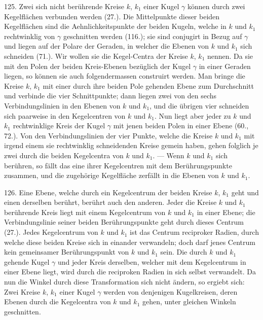 \label{p14}


\hspace{\parindent}%
125. Zwei sich nicht ber\"uhrende Kreise $k$, $k_1$ einer
Kugel $\gamma$ k\"onnen durch zwei Kegelfl\"achen verbunden werden
(27.). Die Mittelpunkte dieser beiden Kegelfl\"achen sind die
Aehnlichkeitspunkte der beiden Kugeln, welche in $k$ und $k_1$
rechtwinklig von $\gamma$ geschnitten werden (116.); sie sind conjugirt
in Bezug auf $\gamma$ und liegen auf der Polare der Geraden,
in welcher die Ebenen von $k$ und $k_1$ sich schneiden (71.).
Wir wollen sie die {\glqq}Kegel-Centra{\grqq} der Kreise $k$, $k_1$ nennen.
Da sie mit den Polen der beiden Kreis-Ebenen bez\"uglich der
Kugel $\gamma$ in einer Geraden liegen, so k\"onnen sie auch folgendermassen
construirt werden. Man bringe die Kreise $k$, $k_1$ mit
einer durch ihre beiden Pole gehenden Ebene zum Durchschnitt
und verbinde die vier Schnittpunkte; dann liegen
zwei von den sechs Verbindungslinien in den Ebenen von $k$
und $k_1$, und die \"ubrigen vier schneiden sich paarweise in den
Kegelcentren von $k$ und $k_1$. Nun liegt aber jeder zu $k$ und $k_1$
rechtwinklige Kreis der Kugel $\gamma$ mit jenen beiden Polen in
einer Ebene (60., 72.). Von den Verbindungslinien der vier
Punkte, welche die Kreise $k$ und $k_1$ mit irgend einem sie
rechtwinklig schneidenden Kreise gemein haben, gehen folglich
je zwei durch die beiden Kegelcentra von $k$ und $k_1$. --- Wenn
$k$ und $k_1$ sich ber\"uhren, so f\"allt das eine ihrer Kegelcentren
mit dem Ber\"uhrungspunkte zusammen, und die zugeh\"orige
Kegelfl\"ache zerf\"allt in die Ebenen von $k$ und $k_1$.

126. Eine Ebene, welche durch ein Kegelcentrum der
beiden Kreise $k$, $k_1$ geht und einen derselben ber\"uhrt, ber\"uhrt
auch den anderen. Jeder die Kreise $k$ und $k_1$ ber\"uhrende
Kreis liegt mit einem Kegelcentrum von $k$ und $k_1$ in einer
Ebene; die Verbindungslinie seiner beiden Ber\"uhrungspunkte
geht durch dieses Centrum (27.). Jedes Kegelcentrum von
$k$ und $k_1$ ist das Centrum reciproker Radien, durch welche
diese beiden Kreise sich in einander verwandeln; doch darf
jenes Centrum kein gemeinsamer Ber\"uhrungspunkt von $k$
und $k_1$ sein. Die durch $k$ und $k_1$ gehende Kugel $\gamma$ und jeder
Kreis derselben, welcher mit dem Kegelcentrum in einer Ebene
liegt, wird durch die reciproken Radien in sich selbst verwandelt.
Da nun die Winkel durch diese Transformation sich
nicht \"andern, so ergiebt sich: Zwei Kreise $k$, $k_1$ einer Kugel $\gamma$
werden von denjenigen Kugelkreisen, deren Ebenen durch
die Kegelcentra von $k$ und $k_1$ gehen, unter gleichen Winkeln
geschnitten.

